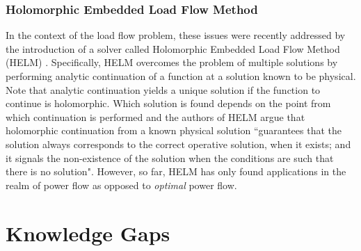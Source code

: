 \documentclass[11pt]{cmuthesis} %
\begin{document}
\subsubsection{Holomorphic Embedded Load Flow Method}
In the context of the load flow problem, these issues were recently addressed by the introduction of a solver called Holomorphic Embedded Load Flow Method (HELM) \cite{trias2012holomorphic,trias2015fundamentals}. Specifically, HELM overcomes the problem of multiple solutions by performing analytic continuation of a function at a solution known to be physical. Note that analytic continuation yields a unique solution if the function to continue is holomorphic. Which solution is found depends on the point from which continuation is performed and the authors of HELM argue that holomorphic continuation from a known physical solution ``guarantees that the solution always corresponds to the correct operative solution, when it exists; and it signals the non-existence of the solution when the conditions are such that there is no solution"\cite{trias2012holomorphic}. However, so far, HELM has only found applications in the realm of power flow as opposed to \emph{optimal} power flow.


\section{Knowledge Gaps}
\end{document}
